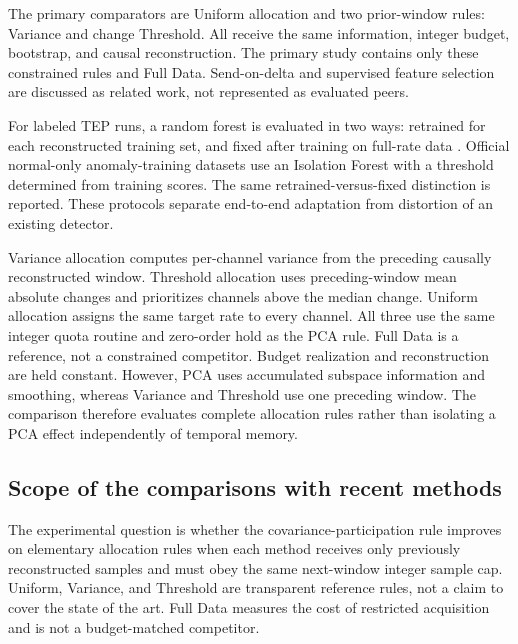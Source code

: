 \documentclass[pdflatex,sn-vancouver-num]{sn-jnl}
\theoremstyle{thmstyleone}
\begin{document}
The primary comparators are Uniform allocation and two prior-window rules:
Variance and change Threshold. All receive the same information, integer
budget, bootstrap, and causal reconstruction. The primary study contains only these constrained rules and Full Data.
Send-on-delta and supervised feature selection are discussed as related work,
not represented as evaluated peers.

For labeled TEP runs, a random forest is evaluated in two ways: retrained for
each reconstructed training set, and fixed after training on full-rate data
\cite{breiman2001random}. Official normal-only anomaly-training datasets use an
Isolation Forest with a threshold determined from training scores. The same
retrained-versus-fixed distinction is reported. These protocols separate
end-to-end adaptation from distortion of an existing detector.

Variance allocation computes per-channel variance from the preceding causally
reconstructed window. Threshold allocation uses preceding-window mean absolute
changes and prioritizes channels above the median change. Uniform allocation
assigns the same target rate to every channel. All three use the same integer
quota routine and zero-order hold as the PCA rule. Full Data is a reference,
not a constrained competitor. Budget realization and reconstruction are held constant. However, PCA uses
accumulated subspace information and smoothing, whereas Variance and Threshold
use one preceding window. The comparison therefore evaluates complete allocation
rules rather than isolating a PCA effect independently of temporal memory.

\subsection{Scope of the comparisons with recent methods}
The experimental question is whether the covariance-participation rule improves
on elementary allocation rules when each method receives only previously
reconstructed samples and must obey the same next-window integer sample cap.
Uniform, Variance, and Threshold are transparent reference rules, not a claim
to cover the state of the art. Full Data measures the cost of restricted
acquisition and is not a budget-matched competitor.
\end{document}
